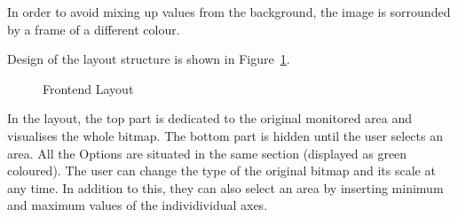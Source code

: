In order to avoid mixing up values from the background, the image is sorrounded
by a frame of a different colour.

Design of the layout structure is shown in Figure~\ref{fig:layout}.
\begin{figure}[ht]
   \begin{center}
		 \hfill
      \caption{Frontend Layout} \label{fig:layout}
	\end{center}
\end{figure}

In the layout, the top part is dedicated to the original monitored area and
visualises the whole bitmap. The bottom part is hidden until the user selects
an area. All the Options are situated in the same section
(displayed as green coloured). The user can change the type of the original
bitmap and its scale at any time. In addition to this, they can also select
an area by inserting minimum and maximum values of the individividual axes.

